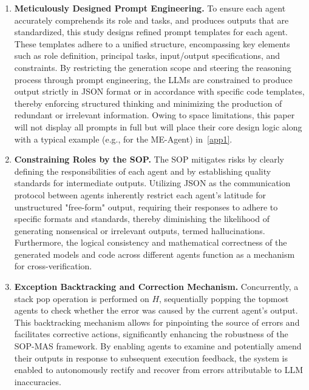 \documentclass[preprint,12pt]{elsarticle}
\begin{document}
\begin{enumerate}[label=\arabic*)]
    \item \textbf{Meticulously Designed Prompt Engineering.} To ensure each agent accurately comprehends its role and tasks, and produces outputs that are standardized, this study designs refined prompt templates for each agent. These templates adhere to a unified structure, encompassing key elements such as role definition, principal tasks, input/output specifications, and constraints. By restricting the generation scope and steering the reasoning process through prompt engineering, the LLMs are constrained to produce output strictly in JSON format or in accordance with specific code templates, thereby enforcing structured thinking and minimizing the production of redundant or irrelevant information. Owing to space limitations, this paper will not display all prompts in full but will place their core design logic along with a typical example (e.g., for the ME-Agent) in~\ref{app1}.
    \item \textbf{Constraining Roles by the SOP.} The SOP mitigates risks by clearly defining the responsibilities of each agent and by establishing quality standards for intermediate outputs. Utilizing JSON as the communication protocol between agents inherently restrict each agent's latitude for unstructured "free-form" output, requiring their responses to adhere to specific formats and standards, thereby diminishing the likelihood of generating nonsensical or irrelevant outputs, termed hallucinations. Furthermore, the logical consistency and mathematical correctness of the generated models and code across different agents function as a mechanism for cross-verification.
  \item \textbf{Exception Backtracking and Correction Mechanism.}  Concurrently, a stack pop operation is performed on $H$, sequentially popping the topmost agents to check whether the error was caused by the current agent's output. This backtracking mechanism allows for pinpointing the source of errors and facilitates corrective actions, significantly enhancing the robustness of the SOP-MAS framework. By enabling agents to examine and potentially amend their outputs in response to subsequent execution feedback, the system is enabled to autonomously rectify and recover from errors attributable to LLM inaccuracies.
\end{enumerate}
\end{document}
